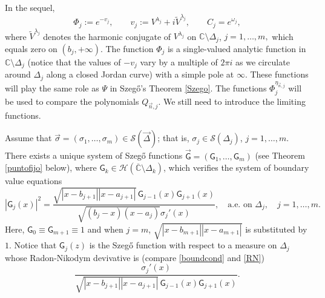 \documentclass{amsart}
\numberwithin{equation}{section}
\theoremstyle{definition}
\newcommand{\CC}{\mathbb{C}}      %
\newcommand{\n}{\vec{n}}          %
\begin{document}
    In the sequel,
    \begin{equation}
        \label{compar}
        \Phi_j:= e^{-v_j},\qquad v_j := V^{\lambda_j} + i\widetilde{V}^{\lambda_j}, \qquad C_j = e^{\omega_j},
    \end{equation}
    where $\widetilde{V}^{\lambda_j}$ denotes the harmonic conjugate of $V^{\lambda_j}$ on $\CC\setminus\Delta_j$, $j=1,\ldots,m,$ which equals zero on $ (b_j,+\infty)$. The function $\Phi_j$ is a single-valued analytic function in $\CC \setminus \Delta_j$ (notice that the values of $-v_j$ vary by a multiple of $2\pi i$ as we circulate around $\Delta_j$ along a closed Jordan curve) with a simple pole at $\infty$. These functions will play the same role as $\Psi$ in Szeg\H{o}'s Theorem \ref{Szego}. The functions $\Phi_j^{\eta_{\n,j}}$ will be used to compare  the polynomials $Q_{\n,j}$. We still need to introduce the limiting functions.

    Assume that $\vec{\sigma} = (\sigma_1,\ldots,\sigma_m) \in \mathcal{S}(\vec{\Delta})$; that is, $\sigma_j \in \mathcal{S}(\Delta_j)$, $j=1,\ldots,m$. There exists a unique system of Szeg\H{o} functions $\vec{\mathsf{G}} = (\mathsf{G}_1,\ldots,\mathsf{G}_m)$ (see Theorem \ref{puntofijo} below), where $\mathsf{G}_k \in \mathcal{H}(\overline{\CC} \setminus \Delta_k)$, which verifies the system of boundary value equations
    \begin{equation}
    	\label{boundcond}
    	|\mathsf{G}_j(x)|^2 = \frac{\sqrt{|x -b_{j+1}||x-a_{j+1}|}\,\mathsf{G}_{j-1}(x) \mathsf{G}_{j+1}(x)}{\sqrt{(b_j -x)(x-a_j)} \sigma_j'(x)},\quad \mbox{a.e. on}\,\, \Delta_j, \quad j=1,\ldots,m.
    \end{equation}
    Here, $\mathsf{G}_0 \equiv \mathsf{G}_{m+1} \equiv 1$ and when $j=m$, $\sqrt{|x -b_{m+1}||x-a_{m+1}|}$ is substituted by $1$. Notice that $\mathsf{G}_j(z)$ is the Szeg\H{o} function with respect to a measure on $\Delta_j$ whose Radon-Nikodym devivative is (compare \eqref{boundcond} and \eqref{RN})
    \[  \frac{\sigma_j'(x) }{\sqrt{|x -b_{j+1}||x-a_{j+1}|}\,\mathsf{G}_{j-1}(x)\mathsf{G}_{j+1}(x)}.
    \]
\end{document}
